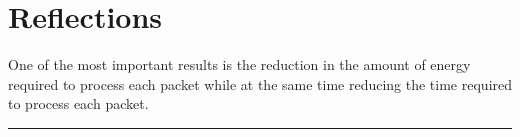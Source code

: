 \section{Reflections}
\label{sec:reflections}






One of the most important results is the reduction in the amount of
energy required to process each packet while at the same time reducing the
time required to process each packet.




\noindent\rule{\textwidth}{0.4mm}




\cleardoublepage
